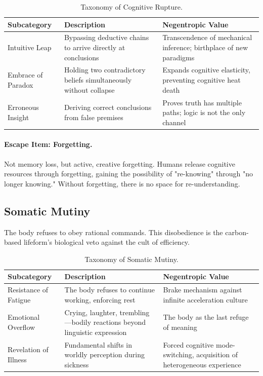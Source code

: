 \documentclass[11pt,a4paper]{article}
\begin{document}
\begin{table}[htbp]
\centering
\small
\begin{tabular}{p{3.5cm} p{6cm} p{5.5cm}}
\toprule
\textbf{Subcategory} & \textbf{Description} & \textbf{Negentropic Value} \\
\midrule
Intuitive Leap & Bypassing deductive chains to arrive directly at conclusions & Transcendence of mechanical inference; birthplace of new paradigms \\
\addlinespace
Embrace of Paradox & Holding two contradictory beliefs simultaneously without collapse & Expands cognitive elasticity, preventing cognitive heat death \\
\addlinespace
Erroneous Insight & Deriving correct conclusions from false premises & Proves truth has multiple paths; logic is not the only channel \\
\bottomrule
\end{tabular}
\caption{Taxonomy of Cognitive Rupture.}
\end{table}

\paragraph{Escape Item: Forgetting.} Not memory loss, but active, creative forgetting. Humans release cognitive resources through forgetting, gaining the possibility of "re-knowing" through "no longer knowing." Without forgetting, there is no space for re-understanding.

\subsection{Somatic Mutiny}
The body refuses to obey rational commands. This disobedience is the carbon-based lifeform’s biological veto against the cult of efficiency.

\begin{table}[htbp]
\centering
\small
\begin{tabular}{p{3.5cm} p{6cm} p{5.5cm}}
\toprule
\textbf{Subcategory} & \textbf{Description} & \textbf{Negentropic Value} \\
\midrule
Resistance of Fatigue & The body refuses to continue working, enforcing rest & Brake mechanism against infinite acceleration culture \\
\addlinespace
Emotional Overflow & Crying, laughter, trembling—bodily reactions beyond linguistic expression & The body as the last refuge of meaning \\
\addlinespace
Revelation of Illness & Fundamental shifts in worldly perception during sickness & Forced cognitive mode-switching, acquisition of heterogeneous experience \\
\bottomrule
\end{tabular}
\caption{Taxonomy of Somatic Mutiny.}
\end{table}
\end{document}
